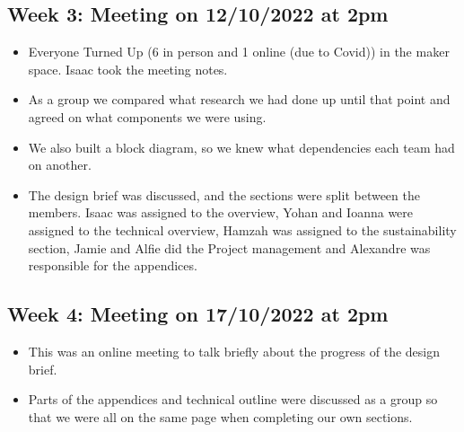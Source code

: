 \subsection{Week 3: Meeting on 12/10/2022 at 2pm }
\begin{itemize}
    \item Everyone Turned Up (6 in person and 1 online (due to Covid)) in the maker space. Isaac took the meeting notes. 
    \item As a group we compared what research we had done up until that point and agreed on what components we were using. 
    \item We also built a block diagram, so we knew what dependencies each team had on another. 
    \item The design brief was discussed, and the sections were split between the members. Isaac was assigned to the overview, Yohan and Ioanna were assigned to the technical overview, Hamzah was assigned to the sustainability section, Jamie and Alfie did the Project management and Alexandre was responsible for the appendices.  
\end{itemize}
    
\subsection{Week 4: Meeting on 17/10/2022 at 2pm }
\begin{itemize}
    \item This was an online meeting to talk briefly about the progress of the design brief. 
    \item Parts of the appendices and technical outline were discussed as a group so that we were all on the same page when completing our own sections. 
\end{itemize}

